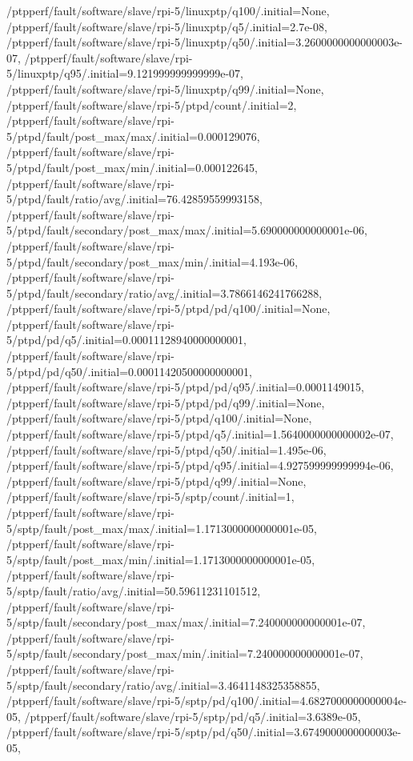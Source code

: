 {    /ptpperf/fault/software/slave/rpi-5/linuxptp/q100/.initial=None,
    /ptpperf/fault/software/slave/rpi-5/linuxptp/q5/.initial=2.7e-08,
    /ptpperf/fault/software/slave/rpi-5/linuxptp/q50/.initial=3.2600000000000003e-07,
    /ptpperf/fault/software/slave/rpi-5/linuxptp/q95/.initial=9.121999999999999e-07,
    /ptpperf/fault/software/slave/rpi-5/linuxptp/q99/.initial=None,
    /ptpperf/fault/software/slave/rpi-5/ptpd/count/.initial=2,
    /ptpperf/fault/software/slave/rpi-5/ptpd/fault/post_max/max/.initial=0.000129076,
    /ptpperf/fault/software/slave/rpi-5/ptpd/fault/post_max/min/.initial=0.000122645,
    /ptpperf/fault/software/slave/rpi-5/ptpd/fault/ratio/avg/.initial=76.42859559993158,
    /ptpperf/fault/software/slave/rpi-5/ptpd/fault/secondary/post_max/max/.initial=5.690000000000001e-06,
    /ptpperf/fault/software/slave/rpi-5/ptpd/fault/secondary/post_max/min/.initial=4.193e-06,
    /ptpperf/fault/software/slave/rpi-5/ptpd/fault/secondary/ratio/avg/.initial=3.7866146241766288,
    /ptpperf/fault/software/slave/rpi-5/ptpd/pd/q100/.initial=None,
    /ptpperf/fault/software/slave/rpi-5/ptpd/pd/q5/.initial=0.00011128940000000001,
    /ptpperf/fault/software/slave/rpi-5/ptpd/pd/q50/.initial=0.00011420500000000001,
    /ptpperf/fault/software/slave/rpi-5/ptpd/pd/q95/.initial=0.0001149015,
    /ptpperf/fault/software/slave/rpi-5/ptpd/pd/q99/.initial=None,
    /ptpperf/fault/software/slave/rpi-5/ptpd/q100/.initial=None,
    /ptpperf/fault/software/slave/rpi-5/ptpd/q5/.initial=1.5640000000000002e-07,
    /ptpperf/fault/software/slave/rpi-5/ptpd/q50/.initial=1.495e-06,
    /ptpperf/fault/software/slave/rpi-5/ptpd/q95/.initial=4.927599999999994e-06,
    /ptpperf/fault/software/slave/rpi-5/ptpd/q99/.initial=None,
    /ptpperf/fault/software/slave/rpi-5/sptp/count/.initial=1,
    /ptpperf/fault/software/slave/rpi-5/sptp/fault/post_max/max/.initial=1.1713000000000001e-05,
    /ptpperf/fault/software/slave/rpi-5/sptp/fault/post_max/min/.initial=1.1713000000000001e-05,
    /ptpperf/fault/software/slave/rpi-5/sptp/fault/ratio/avg/.initial=50.59611231101512,
    /ptpperf/fault/software/slave/rpi-5/sptp/fault/secondary/post_max/max/.initial=7.240000000000001e-07,
    /ptpperf/fault/software/slave/rpi-5/sptp/fault/secondary/post_max/min/.initial=7.240000000000001e-07,
    /ptpperf/fault/software/slave/rpi-5/sptp/fault/secondary/ratio/avg/.initial=3.4641148325358855,
    /ptpperf/fault/software/slave/rpi-5/sptp/pd/q100/.initial=4.6827000000000004e-05,
    /ptpperf/fault/software/slave/rpi-5/sptp/pd/q5/.initial=3.6389e-05,
    /ptpperf/fault/software/slave/rpi-5/sptp/pd/q50/.initial=3.6749000000000003e-05,
}
